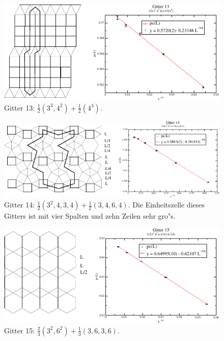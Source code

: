 \begin{figure}[p]
  \includegraphics{./Numerik-figs/2-uni-13_fig}
  \caption{Gitter 13: $\frac{1}{2}(3^3,4^2)+\frac{1}{2}(4^4)$. }
\end{figure}
\clearpage
\begin{figure}[p]
  \includegraphics{./Numerik-figs/2-uni-14_fig}
  \caption{Gitter 14: $\frac{1}{2}(3^2,4,3,4)+\frac{1}{2}(3,4,6,4)$. Die Einheitszelle dieses Gitters ist mit vier Spalten und zehn Zeilen sehr gro"s.  }
\end{figure}
\begin{figure}[p]
  \includegraphics{./Numerik-figs/2-uni-15_fig}
  \caption{Gitter 15: $\frac{2}{3}(3^2,6^2)+\frac{1}{3}(3,6,3,6)$.}
\end{figure}
